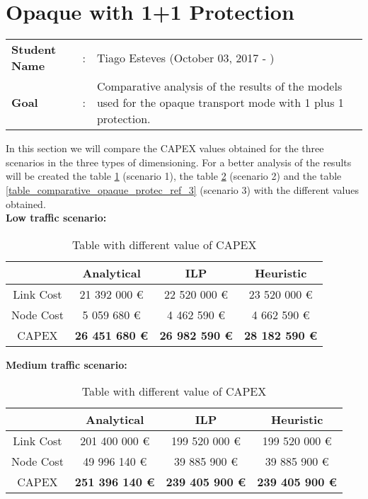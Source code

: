 \clearpage

\section{Opaque with 1+1 Protection}\label{comparative_Opaque_Protection}
\begin{tcolorbox}	
\begin{tabular}{p{2.75cm} p{0.2cm} p{10.5cm}} 	
\textbf{Student Name}  &:& Tiago Esteves    (October 03, 2017 - )\\
\textbf{Goal}          &:& Comparative analysis of the results of the models used for the opaque transport mode with 1 plus 1 protection.
\end{tabular}
\end{tcolorbox}
\vspace{11pt}


In this section we will compare the CAPEX values obtained for the three scenarios in the three types of dimensioning. For a better analysis of the results will be created the table \ref{table_comparative_opaque_protec_ref_1} (scenario 1), the table \ref{table_comparative_opaque_protec_ref_2} (scenario 2) and the table \ref{table_comparative_opaque_protec_ref_3} (scenario 3) with the different values obtained.\\

\textbf{Low traffic scenario:}

\begin{table}[h!]
\centering
\begin{tabular}{| c | c | c | c |}
 \hline
   & Analytical & ILP & Heuristic \\
 \hline\hline
 Link Cost & 21 392 000 \euro & 22 520 000 \euro & 23 520 000 \euro \\
 Node Cost & 5 059 680 \euro & 4 462 590 \euro & 4 662 590 \euro \\
 CAPEX & \textbf{26 451 680 \euro} & \textbf{26 982 590 \euro} & \textbf{28 182 590 \euro} \\
 \hline
\end{tabular}
\caption{Table with different value of CAPEX }
\label{table_comparative_opaque_protec_ref_1}
\end{table}


\vspace{11pt}
\textbf{Medium traffic scenario:}

\begin{table}[h!]
\centering
\begin{tabular}{| c | c | c | c |}
 \hline
   & Analytical & ILP & Heuristic \\
 \hline\hline
 Link Cost & 201 400 000 \euro & 199 520 000 \euro & 199 520 000 \euro \\
 Node Cost & 49 996 140 \euro & 39 885 900 \euro & 39 885 900 \euro \\
 CAPEX & \textbf{251 396 140 \euro} & \textbf{239 405 900 \euro} & \textbf{239 405 900 \euro} \\
 \hline
\end{tabular}
\caption{Table with different value of CAPEX }
\label{table_comparative_opaque_protec_ref_2}
\end{table}


